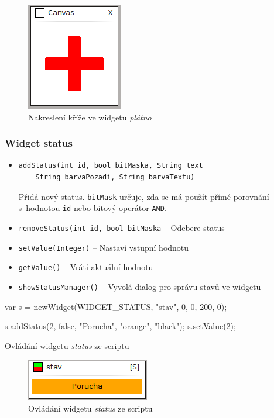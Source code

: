 \documentclass[12pt, a4paper, oneside]{article}
\newcommand{\It}{\textit}  %
\begin{document}
\begin{figure}[H]
\begin{center}
\includegraphics[scale=1]{img/w_canvas.png}
\caption{Nakreslení kříže ve widgetu \It{plátno}}
\end{center}
\end{figure}

\subsubsection*{Widget status}
\begin{itemize}
    \item {\color{blue}
    \begin{verbatim}addStatus(int id, bool bitMaska, String text
    String barvaPozadí, String barvaTextu)
    \end{verbatim}} Přidá nový status. \verb|bitMask| určuje, zda se má použít přímé porovnání s~hodnotou \verb|id| nebo bitový operátor \verb|AND|.
    \item {\color{blue}\verb/removeStatus(int id, bool bitMaska/} -- Odebere status
    \item {\color{blue}\verb/setValue(Integer)/} -- Nastaví vstupní hodnotu
    \item {\color{blue}\verb/getValue()/} -- Vrátí aktuální hodnotu
    \item {\color{blue}\verb/showStatusManager()/} -- Vyvolá dialog pro správu stavů ve widgetu
\end{itemize}

\begin{listing}[H]
\begin{jscode}
var s = newWidget(WIDGET_STATUS, "stav", 0, 0, 200, 0);

s.addStatus(2, false, "Porucha", "orange", "black");
s.setValue(2);
\end{jscode}
\caption{Ovládání widgetu \It{status} ze scriptu}
\end{listing}

\begin{figure}[H]
\begin{center}
\includegraphics[scale=1]{img/status_script.png}
\caption{Ovládání widgetu \It{status} ze scriptu}
\end{center}
\end{figure}
\end{document}
